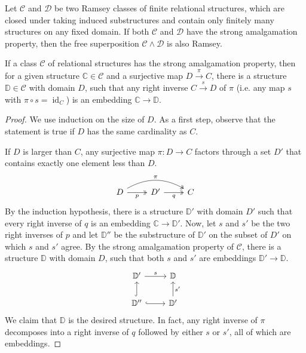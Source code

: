 \documentclass[preprint,12pt]{elsarticle}
\newcommand{\cat}[1]{\mathcal{#1}}
\newcommand{\str}[1]{\mathbb{#1}}
\DeclareMathOperator{\id}{id}
\begin{document}
\begin{prop}
\label{prop:superposition}
    Let $\cat C$ and $\cat D$ be two Ramsey classes of finite relational structures, which are closed under taking induced substructures and contain only finitely many structures on any fixed domain. If both $\cat C$ and $\cat D$ have the strong amalgamation property, then the free superposition $\cat C\wedge \cat D$ is also Ramsey.
\end{prop}


\begin{lem}
\label{lem:superposition}
If a class $\cat C$ of relational structures has the strong amalgamation property, then for a given structure $\str C\in\cat C$ and a surjective map $D\xrightarrow{\pi} C$, there is a structure $\str D\in\cat C$ with domain $D$, such that any right inverse $C \xrightarrow{s} D$ of $\pi$ (i.e. any map $s$ with $\pi\circ s=\id_C$) is an embedding $\str C\to \str D$.
\end{lem}

\begin{proof}
We use induction on the size of $D$. As a first step, observe that the statement is true if $D$ has the same cardinality as $C$. 

If $D$ is larger than $C$, any surjective map $\pi:D\to C$ factors through a set $D'$ that contains exactly one element less than $D$.
$$
\begin{tikzcd}
D \arrow[r, "p"', two heads] \arrow[rr,"\pi", two heads, bend left] & D' \arrow[r, "q"', two heads] & C
\end{tikzcd}
$$
By the induction hypothesis, there is a structure $\str D'$ with domain $D'$ such that every right inverse of $q$ is an embedding $\str C\to \str D'$.
Now, let $s$ and $s'$ be the two right inverses of $p$ and let $\str D''$ be the substructure of $\str D'$ on the subset of $D'$ on which $s$ and $s'$ agree. By the strong amalgamation property of $\cat C$, there is a structure $\str D$ with domain $D$, such that both $s$ and $s'$ are embeddings $\str D'\to \str D$.
$$
\begin{tikzcd}
\str D' \arrow[r,"s"]       & \str D                   \\
\str D'' \arrow[u,hook] \arrow[r,hook] &\str D' \arrow[u, "s'"']
\end{tikzcd}
$$
We claim that $\str D$ is the desired structure. In fact, any right inverse of $\pi$ decomposes into a right inverse of $q$ followed by either $s$ or $s'$, all of which are embeddings.
\end{proof}
\end{document}
